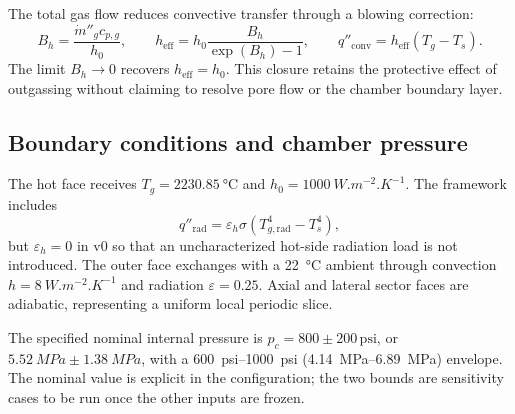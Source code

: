 \documentclass[oneside,openany]{amsdtx}
\begin{document}
The total gas flow reduces convective transfer through a blowing correction:
\begin{equation}
 B_h=\frac{\dot m''_g c_{p,g}}{h_0},\qquad
 h_{\mathrm{eff}}=h_0\frac{B_h}{\exp(B_h)-1},\qquad
 q''_{\mathrm{conv}}=h_{\mathrm{eff}}(T_g-T_s).
 \label{eq:v0-blowing}
\end{equation}
The limit \(B_h\rightarrow0\) recovers \(h_{\mathrm{eff}}=h_0\). This closure
retains the protective effect of outgassing without claiming to resolve pore
flow or the chamber boundary layer.

\subsection{Boundary conditions and chamber pressure}
The hot face receives \(T_g=\SI{2230.85}{\degreeCelsius}\) and
\(h_0=\SI{1000}{W.m^{-2}.K^{-1}}\). The framework includes
\begin{equation}
 q''_{\mathrm{rad}}=\varepsilon_h\sigma
 \left(T_{g,\mathrm{rad}}^4-T_s^4\right),
\end{equation}
but \(\varepsilon_h=0\) in v0 so that an uncharacterized hot-side radiation
load is not introduced. The outer face exchanges with a
\SI{22}{\degreeCelsius} ambient through convection
\(h=\SI{8}{W.m^{-2}.K^{-1}}\) and radiation
\(\varepsilon=0.25\). Axial and lateral sector faces are adiabatic, representing
a uniform local periodic slice.

The specified nominal internal pressure is
\(p_c=800\pm200\,\mathrm{psi}\), or
\(\SI{5.52}{MPa}\pm\SI{1.38}{MPa}\), with a
\SIrange{600}{1000}{psi} (\SIrange{4.14}{6.89}{MPa}) envelope. The nominal
value is explicit in the configuration; the two bounds are sensitivity cases
to be run once the other inputs are frozen.
\end{document}
